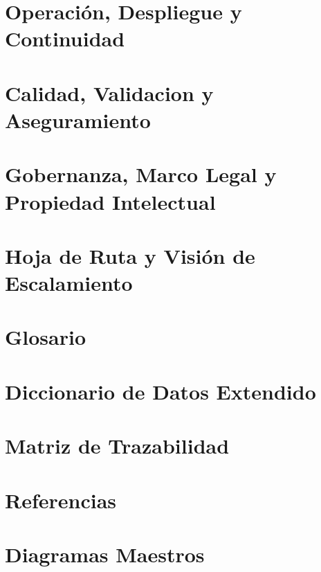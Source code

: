 \documentclass[12pt,a4paper]{report}
\begin{document}
\chapter{Operación, Despliegue y Continuidad}


\chapter{Calidad, Validacion y Aseguramiento}


\chapter{Gobernanza, Marco Legal y Propiedad Intelectual}


\chapter{Hoja de Ruta y Visión de Escalamiento}


\appendix
\chapter{Glosario}


\chapter{Diccionario de Datos Extendido}


\chapter{Matriz de Trazabilidad}


\chapter{Referencias}


\chapter{Diagramas Maestros}

\end{document}
